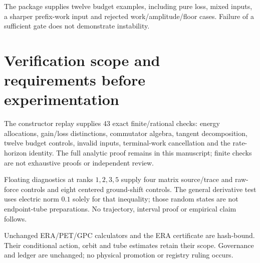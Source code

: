 \documentclass[11pt,a4paper]{article}
\begin{document}
The package supplies twelve budget examples, including pure loss, mixed inputs, a sharper prefix-work input and rejected work/amplitude/floor cases. Failure of a sufficient gate does not demonstrate instability.
\newpage
\section{Verification scope and requirements before experimentation}
The constructor replay supplies 43 exact finite/rational checks: energy allocations, gain/loss distinctions, commutator algebra, tangent decomposition, twelve budget controls, invalid inputs, terminal-work cancellation and the rate-horizon identity. The full analytic proof remains in this manuscript; finite checks are not exhaustive proofs or independent review.

Floating diagnostics at ranks $1,2,3,5$ supply four matrix source/trace and raw-force controls and eight centered ground-shift controls. The general derivative test uses electric norm $0.1$ solely for that inequality; those random states are not endpoint-tube preparations. No trajectory, interval proof or empirical claim follows.

Unchanged ERA/PET/GPC calculators and the ERA certificate are hash-bound. Their conditional action, orbit and tube estimates retain their scope. Governance and ledger are unchanged; no physical promotion or registry ruling occurs.
\end{document}
